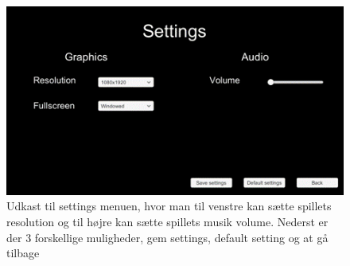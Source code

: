 \begin{figure}[H]
\centering
\includegraphics[width = \textwidth]{02-Body/Images/SettingsMenu-udkast.png}
\caption{Udkast til settings menuen, hvor man til venstre kan sætte spillets resolution og til højre kan sætte spillets musik volume.
Nederst er der 3 forskellige muligheder, gem settings, default setting og at gå tilbage}
\label{fig:Settings-udkast}
\end{figure}
